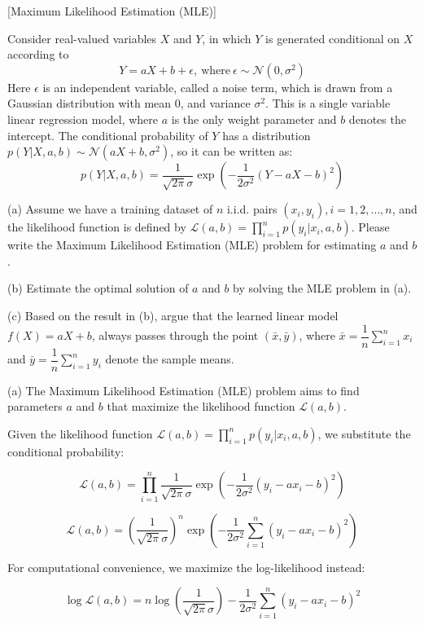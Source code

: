\item {} [Maximum Likelihood Estimation (MLE)]

Consider real-valued variables $X$ and $Y$, in which $Y$ is generated conditional on $X$ according to
$$Y = aX + b + \epsilon, \ \text{where} \ \epsilon \sim \mathcal{N}(0, \sigma^2)$$
Here $\epsilon$ is an independent variable, called a noise term, which is drawn from a Gaussian distribution with mean 0, and variance $\sigma^2$. This is a single variable linear regression model, where $a$ is the only weight parameter and $b$ denotes the intercept. The conditional probability of $Y$ has a distribution $p(Y | X, a, b) \sim \mathcal{N}(aX+b, \sigma^2)$, so it can be written as:
$$p(Y|X, a,b) = \frac{1}{\sqrt{2\pi}\sigma}\exp\left(-\frac{1}{2\sigma^2}(Y - aX -b)^2\right)$$

(a) Assume we have a training dataset of $n$ i.i.d. pairs $(x_i, y_i), i = 1, 2, \ldots, n$, and the likelihood function is defined by $\mathcal{L}(a,b) = \prod\limits_{i=1}^n p(y_i | x_i, a, b)$. Please write the Maximum Likelihood Estimation (MLE) problem for estimating $a$ and $b$. ~

(b) Estimate the optimal solution of $a$ and $b$ by solving the MLE problem in (a).~

(c) Based on the result in (b), argue that the learned linear model $f(X) = aX + b$, always passes through the point $(\bar{x},\bar{y})$, where $\bar{x} = \dfrac{1}{n}\sum\limits_{i=1}^{n}x_{i}$ and $\bar{y} = \dfrac{1}{n}\sum\limits_{i=1}^{n}y_{i}$ denote the sample means.~

\solution

(a) The Maximum Likelihood Estimation (MLE) problem aims to find parameters $a$ and $b$ that maximize the likelihood function $\mathcal{L}(a,b)$.

Given the likelihood function $\mathcal{L}(a,b) = \prod\limits_{i=1}^n p(y_i | x_i, a, b)$, we substitute the conditional probability:

$$\mathcal{L}(a,b) = \prod\limits_{i=1}^n \frac{1}{\sqrt{2\pi}\sigma}\exp\left(-\frac{1}{2\sigma^2}(y_i - ax_i -b)^2\right)$$

$$\mathcal{L}(a,b) = \left(\frac{1}{\sqrt{2\pi}\sigma}\right)^n \exp\left(-\frac{1}{2\sigma^2}\sum_{i=1}^{n}(y_i - ax_i -b)^2\right)$$

For computational convenience, we maximize the log-likelihood instead:

$$\log \mathcal{L}(a,b) = n\log\left(\frac{1}{\sqrt{2\pi}\sigma}\right) -\frac{1}{2\sigma^2}\sum_{i=1}^{n}(y_i - ax_i -b)^2$$

